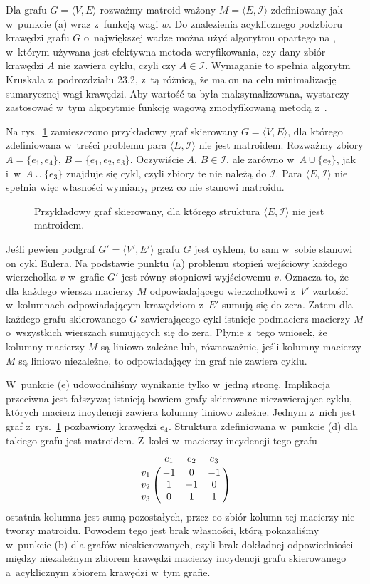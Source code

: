 \subproblem %
Dla grafu $G=\langle V,E\rangle$ rozważmy matroid ważony $M=\langle E,\mathcal{I}\rangle$ zdefiniowany jak w~punkcie (a) wraz z~funkcją wagi $w$.
Do znalezienia acyklicznego podzbioru krawędzi grafu $G$ o~największej wadze można użyć algorytmu opartego na , w~którym używana jest efektywna metoda weryfikowania, czy dany zbiór krawędzi $A$ nie zawiera cyklu, czyli czy $A\in\mathcal{I}$.
Wymaganie to spełnia algorytm Kruskala z~podrozdziału 23.2, z~tą różnicą, że ma on na celu minimalizację sumarycznej wagi krawędzi.
Aby wartość ta była maksymalizowana, wystarczy zastosować w~tym algorytmie funkcję wagową zmodyfikowaną metodą z~.

\subproblem %
Na rys.\ \ref{fig:16-3c} zamieszczono przykładowy graf skierowany $G=\langle V,E\rangle$, dla którego zdefiniowana w~treści problemu para $\langle E,\mathcal{I}\rangle$ nie jest matroidem.
Rozważmy zbiory $A=\{e_1,e_4\}$, $B=\{e_1,e_2,e_3\}$.
Oczywiście $A$, $B\in\mathcal{I}$, ale zarówno w~$A\cup\{e_2\}$, jak i~w~$A\cup\{e_3\}$ znajduje się cykl, czyli zbiory te nie należą do $\mathcal{I}$.
Para $\langle E,\mathcal{I}\rangle$ nie spełnia więc własności wymiany, przez co nie stanowi matroidu.
\begin{figure}[!ht]
	\centering 
	\caption{Przykładowy graf skierowany, dla którego struktura $\langle E,\mathcal{I}\rangle$ nie jest matroidem.} \label{fig:16-3c}
\end{figure}

\subproblem %
Jeśli pewien podgraf $G'=\langle V',E'\rangle$ grafu $G$ jest cyklem, to sam w~sobie stanowi on cykl Eulera.
Na podstawie punktu (a) problemu  stopień wejściowy każdego wierzchołka $v$ w~grafie $G'$ jest równy stopniowi wyjściowemu $v$.
Oznacza to, że dla każdego wiersza macierzy $M$ odpowiadającego wierzchołkowi z~$V'$ wartości w~kolumnach odpowiadającym krawędziom z~$E'$ sumują się do zera.
Zatem dla każdego grafu skierowanego $G$ zawierającego cykl istnieje podmacierz macierzy $M$ o~wszystkich wierszach sumujących się do zera.
Płynie z~tego wniosek, że kolumny macierzy $M$ są liniowo zależne lub, równoważnie, jeśli kolumny macierzy $M$ są liniowo niezależne, to odpowiadający im graf nie zawiera cyklu.

\subproblem %
W~punkcie (e) udowodniliśmy wynikanie tylko w~jedną stronę.
Implikacja przeciwna jest fałszywa; istnieją bowiem grafy skierowane niezawierające cyklu, których macierz incydencji zawiera kolumny liniowo zależne.
Jednym z~nich jest graf z~rys.\ \ref{fig:16-3c} pozbawiony krawędzi $e_4$.
Struktura zdefiniowana w~punkcie (d) dla takiego grafu jest matroidem.
Z~kolei w~macierzy incydencji tego grafu
\[
	\bordermatrix{~ & e_1 & e_2 & e_3 \cr
		v_1 & -1 & 0 & -1 \cr
		v_2 & 1 & -1 & 0 \cr
		v_3 & 0 & 1 & 1}
\]
ostatnia kolumna jest sumą pozostałych, przez co zbiór kolumn tej macierzy nie tworzy matroidu.
Powodem tego jest brak własności, którą pokazaliśmy w~punkcie (b) dla grafów nieskierowanych, czyli brak dokładnej odpowiedniości między niezależnym zbiorem krawędzi macierzy incydencji grafu skierowanego a~acyklicznym zbiorem krawędzi w~tym grafie.
